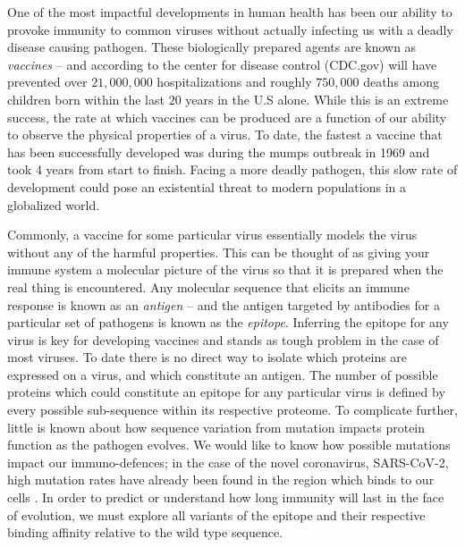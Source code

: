 \documentclass{article}
\begin{document}
One of the most impactful developments in human health has been our ability to provoke immunity to common viruses without actually infecting us with a deadly disease causing pathogen.
These biologically prepared agents are known as \textit{vaccines} --
and according to the center for disease control (CDC.gov) will have prevented over $21,000,000$ hospitalizations and roughly $750,000$
deaths among children born within the last $20$ years in the U.S alone.
While this is an extreme success, the rate at which vaccines can be produced are a function of our ability to observe the physical properties of a virus.
To date, the fastest a vaccine that has been successfully developed was during the mumps outbreak in 1969 and took 4 years from start to finish.
Facing a more deadly pathogen, this slow rate of development could pose an existential threat to modern populations in a globalized world.


Commonly, a vaccine for some particular virus essentially models the virus without any of the harmful properties.
This can be thought of as giving your immune system a molecular picture of the virus so that it is prepared when the real thing is encountered.
Any molecular sequence that elicits an immune response is known as an \textit{antigen} -- and the antigen targeted by antibodies for a particular set of pathogens is known as the \textit{epitope}.
Inferring the epitope for any virus is key for developing vaccines and stands as tough problem in the case of most viruses.
To date there is no direct way to isolate which proteins are expressed on a virus, and which constitute an antigen.
The number of possible proteins which could constitute an epitope for any particular virus is defined by every possible sub-sequence within its respective proteome.
To complicate further, little is known about how sequence variation from mutation impacts protein function as the pathogen evolves.
We would like to know how possible mutations impact our immuno-defences;
in the case of the novel coronavirus, SARS-CoV-2, high mutation rates have already been found in the region which binds to our cells \citep{Stoddard2020}.
In order to predict or understand how long immunity will last in the face of evolution, we must explore all variants of the epitope and their respective binding affinity relative to the wild type sequence.
\end{document}
